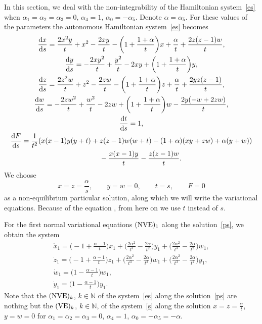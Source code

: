 \documentclass[10pt,a4paper]{amsart}
\numberwithin{equation}{section}
\begin{document}
 In this section, we deal with the non-integrability of the Hamiltonian system~\eqref{es} when
 $\alpha_1=\alpha_2=\alpha_3=0$, $\alpha_4=1$, $\alpha_0=-\alpha_5$. Denote $\alpha=\alpha_5$. For these values of the parameters
 the autonomous Hamiltonian system~\eqref{es} becomes
 \begin{gather*}
 \frac{{\rm d} x}{{\rm d} s}
 =
 \frac{2 x^2 y}{t} + x^2 - \frac{2 x y}{t}
 -\biggl(1 + \frac{1+\alpha}{t}\biggr) x + \frac{\alpha}{t}
 + \frac{2 z (z-1) w }{t},\\
 \frac{{\rm d} y}{{\rm d} s} =
 -\frac{2 x y^2}{t} + \frac{y^2}{t} - 2 x y
 +\biggl(1 + \frac{1+\alpha}{t}\biggr) y ,\\
 \frac{{\rm d} z}{{\rm d} s} =
 \frac{2 z^2 w}{t} + z^2 - \frac{2 z w}{t}
 -\biggl(1 + \frac{1+\alpha}{t}\biggr) z + \frac{\alpha}{t}
 + \frac{2 y z (z-1)}{t},\\
 \frac{{\rm d} w}{{\rm d} s} =
 -\frac{2 z w^2}{t} + \frac{w^2}{t} - 2 z w
 +\biggl(1 + \frac{1+\alpha}{t}\biggr) w -
 \frac{2 y (-w + 2 z w )}{t}, \\
 \frac{{\rm d} t}{{\rm d} s} =
 1, \\
 \frac{{\rm d} F}{{\rm d} s} =
 \frac{1}{t^2} (x (x-1) y (y+t) + z (z-1) w (w+t) - (1+\alpha) (x y + z w)
 + \alpha (y+w)) \\
 \hphantom{\frac{{\rm d} F}{{\rm d} s} =}{} - \frac{x (x-1) y}{t} - \frac{z (z-1) w}{t} .
 \end{gather*}
 We choose
 \begin{equation}
 x=z=\frac{\alpha}{s}, \qquad y=w=0, \qquad t=s, \qquad F=0\label{ps}
 \end{equation}
 as a non-equilibrium particular solution, along which we will write the variational equations. Because of the equation
 , from here on we use $t$ instead of $s$.

 For the first normal variational equations $({\rm NVE})_1$ along the solution~\eqref{ps}, we obtain the system
 \begin{gather}
 \dot{x}_1 =
 \biggl(-1 + \frac{\alpha-1}{t}\biggr) x_1 + \biggl(\frac{2 \alpha^2}{t^3} - \frac{2 \alpha}{t^2}\biggr) y_1
 + \biggl(\frac{2 \alpha^2}{t^3} - \frac{2 \alpha}{t^2}\biggr) w_1,\nonumber\\
 \dot{z}_1 =
 \biggl(-1 + \frac{\alpha-1}{t} \biggr) z_1 +
 \biggl(\frac{2 \alpha^2}{t^3} - \frac{2 \alpha}{t^2}\biggr) w_1
 + \biggl(\frac{2 \alpha^2}{t^3} - \frac{2 \alpha}{t^2}\biggr) y_1,\nonumber\\
 \dot{w}_1 =
 \biggl(1 - \frac{\alpha-1}{t}\biggr) w_1,\nonumber\\
 \dot{y}_1 =
 \biggl(1 - \frac{ \alpha -1}{t} \biggr) y_1 .\label{fve}
 \end{gather}
 Note that the $({\rm NVE})_k$, $k\in\mathbb{N}$ of the system~\eqref{es} along the solution~\eqref{ps} are nothing but the $({\rm VE})_k$, $k\in\mathbb{N}$, of the
 system~\eqref{s} along the solution $x=z=\frac{\alpha}{t}$, $y=w=0$ for ${\alpha_1=\alpha_2=\alpha_3=0}$, $\alpha_4=1$, $\alpha_0=-\alpha_5=-\alpha$.
\end{document}
